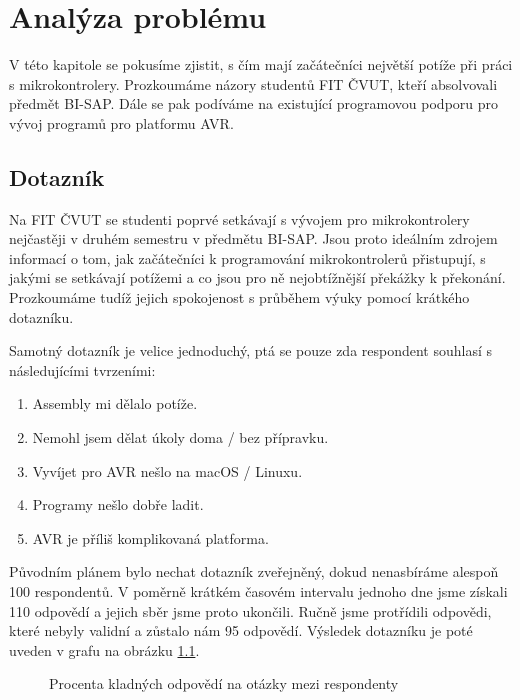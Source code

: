 \chapter{Analýza problému}

V této kapitole se pokusíme zjistit, s čím mají začátečníci největší potíže při práci s mikrokontrolery. Prozkoumáme názory studentů FIT ČVUT, kteří absolvovali předmět BI-SAP. Dále se pak podíváme na existující programovou podporu pro vývoj programů pro platformu AVR.

\section{Dotazník}

Na FIT ČVUT se studenti poprvé setkávají s vývojem pro mikrokontrolery nejčastěji v druhém semestru v předmětu BI-SAP. Jsou proto ideálním zdrojem informací o tom, jak začátečníci k programování mikrokontrolerů přistupují, s jakými se setkávají potížemi a co jsou pro ně nejobtížnější překážky k překonání. Prozkoumáme tudíž jejich spokojenost s průběhem výuky pomocí krátkého dotazníku.

Samotný dotazník je velice jednoduchý, ptá se pouze zda respondent souhlasí s následujícími tvrzeními:

\begin{enumerate}
	\item Assembly mi dělalo potíže.
	\item Nemohl jsem dělat úkoly doma / bez přípravku.
	\item Vyvíjet pro AVR nešlo na macOS / Linuxu.
	\item Programy nešlo dobře ladit.
	\item AVR je příliš komplikovaná platforma.
\end{enumerate}

Původním plánem bylo nechat dotazník zveřejněný, dokud nenasbíráme alespoň 100 respondentů. V poměrně krátkém časovém intervalu jednoho dne jsme získali 110 odpovědí a jejich sběr jsme proto ukončili. Ručně jsme protřídili odpovědi, které nebyly validní a zůstalo nám 95 odpovědí. Výsledek dotazníku je poté uveden v grafu na obrázku \ref{fig:survey}.

\begin{figure}
\begin{center}
\caption{Procenta kladných odpovědí na otázky mezi respondenty}
\label{fig:survey}
\end{center}
\end{figure}

